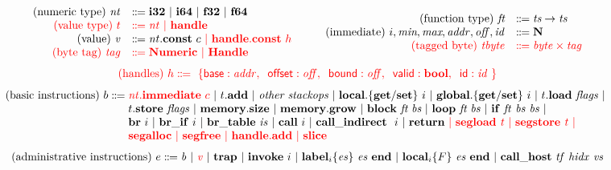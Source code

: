 \documentclass{standalone}
\begin{document}
\footnotesize

\[
  \begin{array}{rl}
    \text{(numeric type)} ~ \V{nt} &\dotdoteq \xxWithirtytwo~|~\xxWisixtyfour~|~\xxWfthirtytwo~|~\xxWfsixtyfour~\\ %
    \rr{\text{(value type)} ~ t} & \rr{\dotdoteq \V{nt}~|~\xxWhandle}\\
    \text{(value)} ~\V{v} &\dotdoteq \V{nt}.\xxWconst~c~\rr{|~\xxWhandle.\xxWconst~h}\\
    \rr{\text{(byte tag)}~\V{tag}} & \rr{\dotdoteq \xxWNumeric ~|~\xxWHandle}
  \end{array}\qquad
  \begin{array}{rl}
    \text{(function type)} ~ \textit{ft} &\dotdoteq \textit{ts} \to \textit{ts}\\
    \text{(immediate)} ~ i,\textit{min},\textit{max},\V{addr},\V{off}, \V{id} &\dotdoteq \xxCN\\
    \rr{\text{(tagged byte)}~\V{tbyte}} & \rr{\dotdoteq \V{byte}\times\V{tag}} 
  \end{array}
  \]
  \[ \rr{\text{(handles)}~h\dotdoteq~\{ \xxWbase:\V{addr},\;\; \xxWoffset:\V{off},\;\; \xxWbound:\V{off},\;\; \xxWvalid:\xxCbool,\;\; \xxWid:\V{id}~\}} \]
\[
  \begin{array}{@{}l@{}}
    \text{(basic instructions)}~b \dotdoteq
    \begin{array}[t]{@{}l@{}}
      \rr{\V{nt}.\xxWimmediate~c}~|~t.\KK{add}~|~\textit{other stackops}~|~
      \KK{local.\{get/set\}}~i~|~\KK{global.\{get/set\}}~i~|~
      t.\KK{load}~\V{flags}~|~
      \\
      t.\KK{store}~\V{flags}~|~\KK{memory.size}~|~ \KK{memory.grow}~|~
      \KK{block}~\textit{ft}~\textit{bs} ~|~ \KK{loop}~\textit{ft}~\V{bs}~|~\KK{if}~\V{ft}~\V{bs}~\V{bs}~|~
      \\
      \KK{br}~i~|~\KK{br\_if}~i~|~\KK{br\_table}~\V{is}~|~ \xxWcall~i~|~\xxWcallindirect~i~|~\KK{return}~\rr{|~\xxWsegload~\V{t}~|~\xxWsegstore~\V{t}~|}
      \\
      \rr{\xxWsegalloc~|~\xxWsegfree~|~\xxWhandleadd~|~\xxWslice}
    \end{array}
  \end{array}
  \]
  \[
  \begin{array}{@{}l@{}}
    \text{(administrative instructions)}~e \dotdoteq
    \begin{array}[t]{@{}l@{}}
      \V{b}~|~\rr{\V{v}}~|~\KK{trap}~|~\xxWinvoke~i~|~\xxWlabel{i}{\V{es}}{\V{es}}~|~
      \xxWlocal{i}{F}{\V{es}}~|~\xxWcallhost~\V{tf}~\V{hidx}~\V{vs}
    \end{array}
  \end{array}
\]
\end{document}
